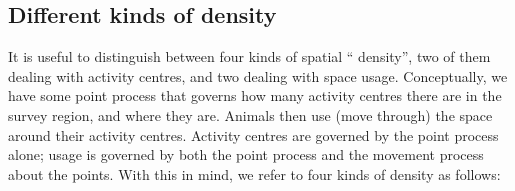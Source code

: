 \documentclass[10pt,a4paper]{article}
\begin{document}

\subsection{Different kinds of density}

It is useful to distinguish between four kinds of spatial `` density'', two of them dealing with activity centres, and two dealing with space usage. Conceptually, we have some point process that governs how many activity centres there are in the survey region, and where they are. Animals then use (move through) the space around their activity centres. Activity centres are governed by the point process alone; usage is governed by both the point process and the movement process about the points. With this in mind, we refer to four kinds of density as follows:
\end{document}
